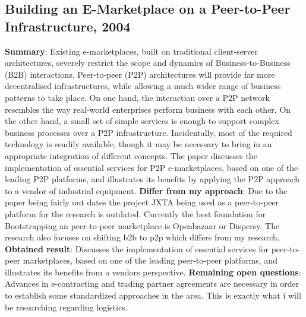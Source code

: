 \documentclass[11pt]{article}
\begin{document}
\subsection{Building an E-Marketplace on a Peer-to-Peer Infrastructure, 2004 \cite{buildingp2pmarketplace}}
\textbf{Summary}: Existing e-marketplaces, built on traditional client-server architectures, severely restrict the scope and dynamics of Business-to-Business (B2B) interactions. Peer-to-peer (P2P) architectures will provide far more decentralised infrastructures, while allowing a much wider range of business patterns to take place. On one hand, the interaction over a P2P network resembles the way real-world enterprises perform business with each other. On the other hand, a small set of simple services is enough to support complex business processes over a P2P infrastructure. Incidentally, most of the required technology is readily available, though it may be necessary to bring in an appropriate integration of different concepts. The paper discusses the implementation of essential services for P2P e-marketplaces, based on one of the leading P2P platforms, and illustrates its benefits by applying the P2P approach to a vendor of industrial equipment.\newline
\textbf{Differ from my approach}: Due to the paper being fairly out dates the  project JXTA being used as a peer-to-peer platform for the research is outdated. Currently the best foundation for Bootstrapping an peer-to-peer marketplace is Openbazaar or Dispersy. The research also focuses on shifting b2b to p2p which differs from my research.\newline
\textbf{Obtained result}: Discusses the implementation of essential services for peer-to-peer marketplaces, based on one of the leading peer-to-peer platforms, and illustrates its benefits from a vendors perspective.\newline
\textbf{Remaining open questions}: Advances in e-contracting and trading partner agreements are necessary in order to establish some standardized approaches in the area. This is exactly what i will be researching regarding logistics. \newline



\end{document}
